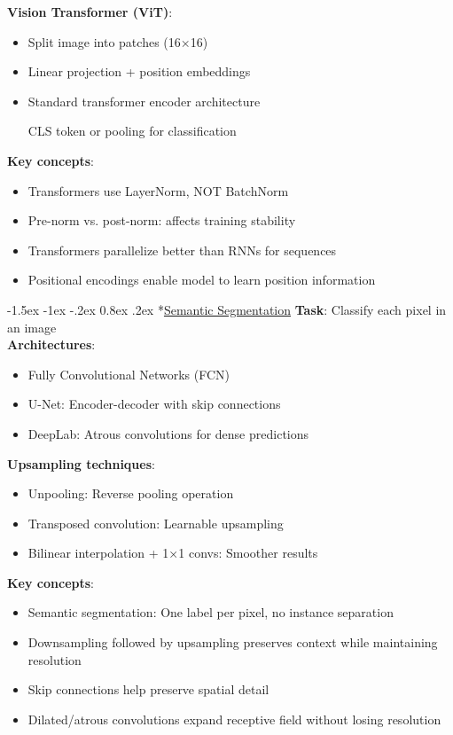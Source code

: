 \documentclass{article}
\makeatletter
\renewcommand\section{\@startsection{section}{1}{\z@}%
                                  {-1.5ex \@plus -1ex \@minus -.2ex}%
                                  {0.8ex \@plus.2ex}%
                                  {\normalfont\small\bfseries}}
\makeatother
\begin{document}
\begin{multicols}{3}
\textbf{Vision Transformer (ViT)}:
\begin{itemize}
\item Split image into patches (16×16)
\item Linear projection + position embeddings
\item Standard transformer encoder architecture
\item [CLS] token or pooling for classification
\end{itemize}

\textbf{Key concepts}:
\begin{itemize}
\item Transformers use LayerNorm, NOT BatchNorm
\item Pre-norm vs. post-norm: affects training stability
\item Transformers parallelize better than RNNs for sequences
\item Positional encodings enable model to learn position information
\end{itemize}

\section*{\underline{Semantic Segmentation}}
\textbf{Task}: Classify each pixel in an image\\
\textbf{Architectures}:
\begin{itemize}
\item Fully Convolutional Networks (FCN)
\item U-Net: Encoder-decoder with skip connections
\item DeepLab: Atrous convolutions for dense predictions
\end{itemize}

\textbf{Upsampling techniques}:
\begin{itemize}
\item Unpooling: Reverse pooling operation
\item Transposed convolution: Learnable upsampling
\item Bilinear interpolation + 1×1 convs: Smoother results
\end{itemize}

\textbf{Key concepts}:
\begin{itemize}
\item Semantic segmentation: One label per pixel, no instance separation
\item Downsampling followed by upsampling preserves context while maintaining resolution
\item Skip connections help preserve spatial detail
\item Dilated/atrous convolutions expand receptive field without losing resolution
\end{itemize}


\end{multicols}
\end{document}
